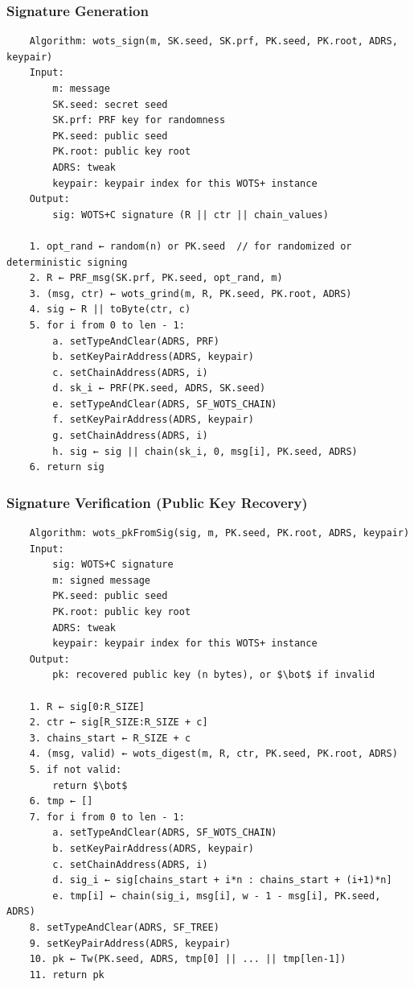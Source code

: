 \subsubsection{Signature Generation}
\begin{verbatim}
    Algorithm: wots_sign(m, SK.seed, SK.prf, PK.seed, PK.root, ADRS, keypair)
    Input:
        m: message
        SK.seed: secret seed
        SK.prf: PRF key for randomness
        PK.seed: public seed
        PK.root: public key root
        ADRS: tweak
        keypair: keypair index for this WOTS+ instance
    Output:
        sig: WOTS+C signature (R || ctr || chain_values)

    1. opt_rand ← random(n) or PK.seed  // for randomized or deterministic signing
    2. R ← PRF_msg(SK.prf, PK.seed, opt_rand, m)
    3. (msg, ctr) ← wots_grind(m, R, PK.seed, PK.root, ADRS)
    4. sig ← R || toByte(ctr, c)
    5. for i from 0 to len - 1:
        a. setTypeAndClear(ADRS, PRF)
        b. setKeyPairAddress(ADRS, keypair)
        c. setChainAddress(ADRS, i)
        d. sk_i ← PRF(PK.seed, ADRS, SK.seed)
        e. setTypeAndClear(ADRS, SF_WOTS_CHAIN)
        f. setKeyPairAddress(ADRS, keypair)
        g. setChainAddress(ADRS, i)
        h. sig ← sig || chain(sk_i, 0, msg[i], PK.seed, ADRS)
    6. return sig
\end{verbatim}

\subsubsection{Signature Verification (Public Key Recovery)}
\begin{verbatim}
    Algorithm: wots_pkFromSig(sig, m, PK.seed, PK.root, ADRS, keypair)
    Input:
        sig: WOTS+C signature
        m: signed message
        PK.seed: public seed
        PK.root: public key root
        ADRS: tweak
        keypair: keypair index for this WOTS+ instance
    Output:
        pk: recovered public key (n bytes), or $\bot$ if invalid

    1. R ← sig[0:R_SIZE]                 
    2. ctr ← sig[R_SIZE:R_SIZE + c]      
    3. chains_start ← R_SIZE + c 
    4. (msg, valid) ← wots_digest(m, R, ctr, PK.seed, PK.root, ADRS)
    5. if not valid:
        return $\bot$
    6. tmp ← []
    7. for i from 0 to len - 1:
        a. setTypeAndClear(ADRS, SF_WOTS_CHAIN)
        b. setKeyPairAddress(ADRS, keypair)
        c. setChainAddress(ADRS, i)
        d. sig_i ← sig[chains_start + i*n : chains_start + (i+1)*n]
        e. tmp[i] ← chain(sig_i, msg[i], w - 1 - msg[i], PK.seed, ADRS)
    8. setTypeAndClear(ADRS, SF_TREE)
    9. setKeyPairAddress(ADRS, keypair)
    10. pk ← Tw(PK.seed, ADRS, tmp[0] || ... || tmp[len-1])
    11. return pk
\end{verbatim}

